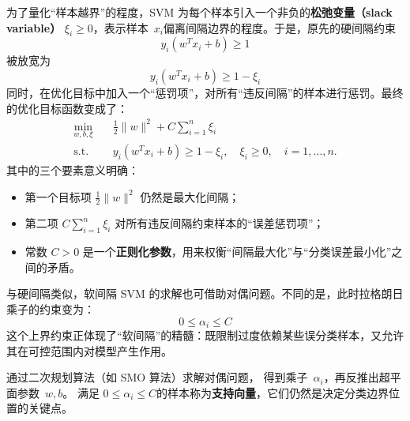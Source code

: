 为了量化“样本越界”的程度，SVM 为每个样本引入一个非负的\textbf{松弛变量（slack variable）} $\xi_i \geq 0$，表示样本~$x_i$偏离间隔边界的程度。于是，原先的硬间隔约束
$$
y_i \left( w^T x_i + b\right) \ge 1
$$
被放宽为
$$
y_i \left( w^T x_i + b\right) \ge 1-\xi_i
$$
同时，在优化目标中加入一个“惩罚项”，对所有“违反间隔”的样本进行惩罚。最终的优化目标函数变成了：
\begin{equation}\label{eq:soft_margin_primal}
\begin{aligned}
\min_{w,b,\xi} \quad & \frac{1}{2} \|w\|^2 + C \sum_{i=1}^n \xi_i \\
\text{s.t.} \quad & y_i(w^T x_i + b) \geq 1 - \xi_i, \quad \xi_i \geq 0, \quad i=1,\dots,n.
\end{aligned}
\end{equation}
其中的三个要素意义明确：
\begin{itemize}
\item 第一个目标项 $\frac{1}{2} \|w\|^2$ 仍然是最大化间隔；
\item 第二项 $C \sum_{i=1}^n \xi_i$ 对所有违反间隔约束样本的“误差惩罚项”；
\item 常数 $C > 0$ 是一个\textbf{正则化参数}，用来权衡“间隔最大化”与“分类误差最小化”之间的矛盾。
\end{itemize}

与硬间隔类似，软间隔 SVM 的求解也可借助对偶问题。不同的是，此时拉格朗日乘子的约束变为：
$$
0\le \alpha_i \le C 
$$
这个上界约束正体现了“软间隔”的精髓：既限制过度依赖某些误分类样本，又允许其在可控范围内对模型产生作用。

通过二次规划算法（如 SMO 算法）求解对偶问题， 得到乘子~$\alpha_i$，再反推出超平面参数~$w, b$。  满足 $0\le \alpha_i \le C $的样本称为{\bf 支持向量}，它们仍然是决定分类边界位置的关键点。

